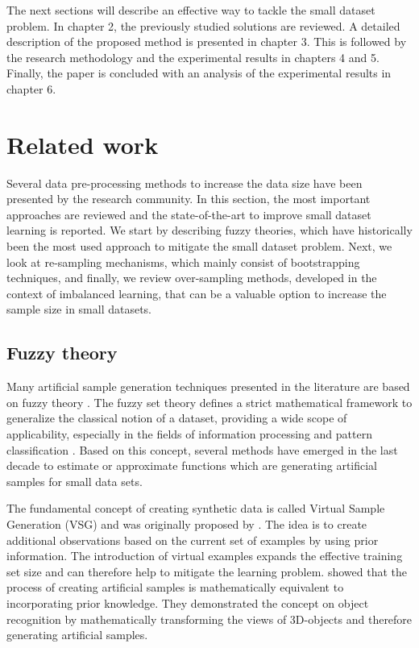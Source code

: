 \documentclass[parskip=full]{scrartcl}
\begin{document}
The next sections will describe an effective way to tackle the small dataset
problem. In chapter 2, the previously studied solutions are reviewed. A detailed
description of the proposed method is presented in chapter 3. This is followed
by the research methodology and the experimental results in chapters 4 and 5.
Finally, the paper is concluded with an analysis of the experimental results in
chapter 6.

\section{Related work}

Several data pre-processing methods to increase the data size have been
presented by the research community. In this section, the most important
approaches are reviewed and the state-of-the-art to improve small dataset
learning is reported. We start by describing fuzzy theories, which have
historically been the most used approach to mitigate the small dataset problem.
Next, we look at re-sampling mechanisms, which mainly consist of bootstrapping
techniques, and finally, we review over-sampling methods, developed in the
context of imbalanced learning, that can be a valuable option to increase the
sample size in small datasets.

\subsection{Fuzzy theory}

Many artificial sample generation techniques presented in the literature are
based on fuzzy theory \cite{AbdulLateh.2017}. The fuzzy set theory defines a
strict mathematical framework to generalize the classical notion of a dataset,
providing a wide scope of applicability, especially in the fields of information
processing and pattern classification \cite{Zimmermann.2010}. Based on this
concept, several methods have emerged in the last decade to estimate or
approximate functions which are generating artificial samples for small data
sets.

The fundamental concept of creating synthetic data is called Virtual Sample
Generation (VSG) and was originally proposed by \cite{Niyogi.1998}. The idea is
to create additional observations based on the current set of examples by using
prior information. The introduction of virtual examples expands the effective
training set size and can therefore help to mitigate the learning problem.
\cite{Niyogi.1998} showed that the process of creating artificial samples is
mathematically equivalent to incorporating prior knowledge. They demonstrated
the concept on object recognition by mathematically transforming the views of
3D-objects and therefore generating artificial samples.
\end{document}

